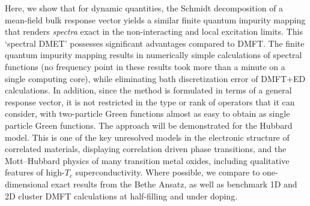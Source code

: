 \documentclass[aps,twocolumn,nobibnotes]{revtex4}
\begin{document}
Here, we show that for dynamic quantities, the Schmidt decomposition of a mean-field bulk response vector yields a similar finite quantum impurity mapping
that renders {\em spectra} exact in the non-interacting and local excitation limits. This `spectral DMET' possesses significant advantages compared to
DMFT. The finite quantum impurity mapping results in numerically simple calculations of spectral functions (no frequency point in these results
took more than a minute on a single computing core), while eliminating bath discretization error of DMFT+ED calculations.
In addition, since the method is formulated in terms of a general response vector, it is not restricted in the type or rank of %
operators that it can consider, with two-particle Green functions almost as easy to obtain as single particle Green functions. 
The approach will be demonstrated for the Hubbard model. 
This is one of the key unresolved models in 
the electronic structure of correlated materials, displaying correlation driven 
phase transitions, and the Mott--Hubbard physics of many transition metal oxides\cite{Limelette2003}, including qualitative features 
of high-$T_c$ superconductivity\cite{Anderson87,Sordi2012,Millis2013}. Where possible, we compare to one-dimensional exact results from the Bethe 
Ansatz\cite{Lieb68,Ovchinni1970}, as well as benchmark 1D and 2D cluster DMFT calculations at half-filling 
and under doping\cite{Go2009,Kotliar2008,Masatoshi2009}. 
\end{document}
